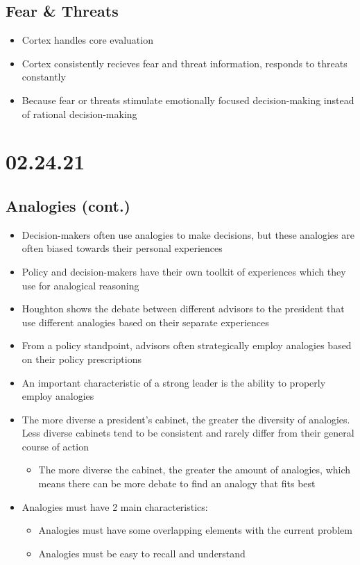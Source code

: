 \documentclass[11pt]{article}
\begin{document}
\subsection*{Fear \& Threats}
\label{sec:org6fac0e1}
\begin{itemize}
\item Cortex handles core evaluation
\item Cortex consistently recieves fear and threat information, responds to threats constantly
\item Because fear or threats stimulate emotionally focused decision-making instead of rational decision-making
\end{itemize}
\section*{02.24.21}
\label{sec:org3c56cfb}
\subsection*{Analogies (cont.)}
\label{sec:org735c545}
\begin{itemize}
\item Decision-makers often use analogies to make decisions, but these analogies are often biased towards their personal experiences
\item Policy and decision-makers have their own toolkit of experiences which they use for analogical reasoning
\item Houghton shows the debate between different advisors to the president that use different analogies based on their separate experiences
\item From a policy standpoint, advisors often strategically employ analogies based on their policy prescriptions
\item An important characteristic of a strong leader is the ability to properly employ analogies
\item The more diverse a president's cabinet, the greater the diversity of analogies. Less diverse cabinets tend to be consistent and rarely differ from their general course of action
\begin{itemize}
\item The more diverse the cabinet, the greater the amount of analogies, which means there can be more debate to find an analogy that fits best
\end{itemize}
\item Analogies must have 2 main characteristics:
\begin{itemize}
\item Analogies must have some overlapping elements with the current problem
\item Analogies must be easy to recall and understand
\end{itemize}
\end{itemize}
\end{document}
